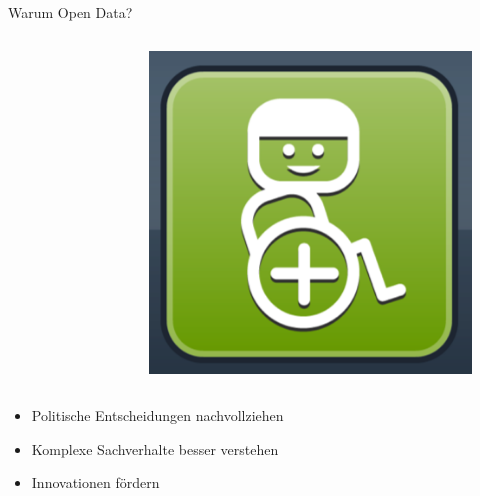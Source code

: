 \begin{frame}[t]{Warum Open Data?}
\begin{columns}
\begin{figure}[h]
  \end{figure}
  \begin{figure}[h]
   \centering
   \includegraphics[scale=0.2]{section_open_data_innovation.png}
  \end{figure}
 \end{columns}

 \begin{block}{}
  \begin{itemize}
  \item Politische Entscheidungen nachvollziehen
  \item Komplexe Sachverhalte besser verstehen
  \item Innovationen fördern
 \end{itemize}
\end{block} 
\end{frame}
